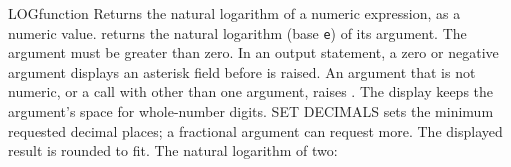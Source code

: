 \begin{XbaseEntry}{LOG}{function}
Returns the natural logarithm of a numeric expression, as a numeric value.
\Syntax
{}
\Usage
{} returns the natural logarithm (base \texttt{e}) of its argument.
The argument must be greater than zero. In an output statement, a zero or
negative argument displays an asterisk field before
 is raised.
An argument that is not numeric, or a call with other than one argument,
raises .
The display keeps the argument's space for whole-number digits.
SET DECIMALS sets the minimum requested decimal places; a fractional
argument can request more. The displayed result is rounded to fit.
\Examples
The natural logarithm of two:
\end{XbaseEntry}

